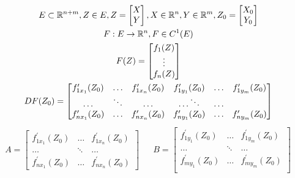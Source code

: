 \documentclass[main]{subfiles}
\begin{document}
      \begin{theorem}
         \begin{gather*}
         E \subset {\vR}^{n+m}, Z \in E, Z = \begin{bmatrix*}
            X \\
            Y
         \end{bmatrix*},
         X \in {\vR}^n, Y \in {\vR}^m, Z_0 = \begin{bmatrix*}
            X_0 \\
            Y_0
         \end{bmatrix*} \\
          F: E \rightarrow {\vR}^n, F \in C^1(E) \\
         F(Z) = \begin{bmatrix*}
            f_1(Z) \\
            \vdots \\
            f_n(Z)
         \end{bmatrix*} \\
         DF(Z_0) = \begin{bmatrix*}
            f^\prime_{1x_1}(Z_0) & \ldots & f^\prime_{1x_n}(Z_0) & f^\prime_{1y_1}(Z_0) & \ldots & f^\prime_{1y_m}(Z_0) \\
            \ldots & \ddots & \ldots & \ldots \ddots & \ldots \\
            f^\prime_{nx_1}(Z_0) & \ldots & f^\prime_{nx_n}(Z_0) & f^\prime_{ny_1}(Z_0) & \ldots & f^\prime_{ny_m}(Z_0) 
         \end{bmatrix*} 
      \end{gather*}
         \begin{align*}
            A = \begin{bmatrix*}
               f^\prime_{1x_1}(Z_0) & \ldots & f^\prime_{1x_n}(Z_0) \\
               \ldots & \ddots & \ldots \\
               f^\prime_{nx_1}(Z_0) & \ldots & f^\prime_{nx_n}(Z_0)
            \end{bmatrix*} && B =
            \begin{bmatrix*}
               f^\prime_{1y_1}(Z_0) & \ldots & f^\prime_{1y_m}(Z_0) \\
               \ldots & \ddots & \ldots \\
               f^\prime_{my_1}(Z_0) & \ldots & f^\prime_{my_m}(Z_0) \\
            \end{bmatrix*}
         \end{align*}
 

\end{theorem}
\end{document}
